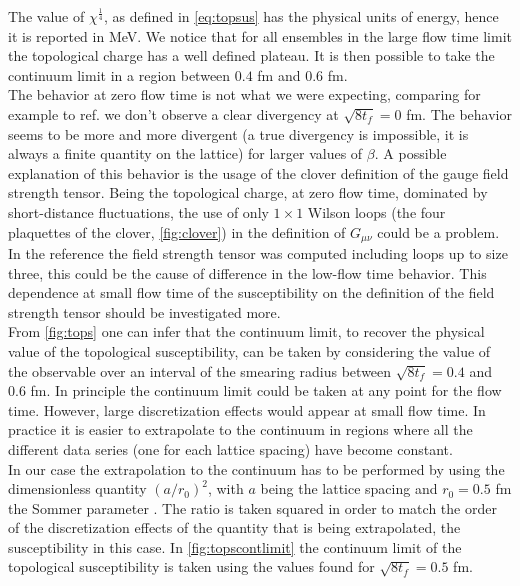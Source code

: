 The value of $\chi^{\frac{1}{4}}$, as defined in \cref{eq:topsus} has the physical units of energy, hence it is reported in MeV. We notice that for all ensembles in the large flow time limit the topological charge has a well defined plateau. It is then possible to take the continuum limit in a region between $0.4$ fm and $0.6$ fm. \\
The behavior at zero flow time is not what we were expecting, comparing for example to ref. \cite{shindler_nucleon_2015} we don't observe a clear divergency at $\sqrt{8t_f} = 0$ fm. The behavior seems to be more and more divergent (a true divergency is impossible, it is always a finite quantity on the lattice) for larger values of $\beta$. A possible explanation of this behavior is the usage of the clover definition of the gauge field strength tensor. Being the topological charge, at zero flow time, dominated by short-distance fluctuations, the use of only $1\times1$ Wilson loops (the four plaquettes of the clover, \cref{fig:clover}) in the definition of $G_{\mu\nu}$ could be a problem. In the reference the field strength tensor was computed including loops up to size three, this could be the cause of difference in the low-flow time behavior. This dependence at small flow time of the susceptibility on the definition of the field strength tensor should be investigated more. \\
From \cref{fig:tops} one can infer that the continuum limit, to recover the physical value of the topological susceptibility, can be taken by considering the value of the observable over an interval of the smearing radius between  $\sqrt{8t_f} = 0.4$ and $0.6$ fm. In principle the continuum limit could be taken at any point for the flow time. However, large discretization effects would appear at small flow time. In practice it is easier to extrapolate to the continuum in regions where all the different data series (one for each lattice spacing) have become constant. \\
In our case the extrapolation to the continuum has to be performed by using the dimensionless quantity $(a/r_0)^2$, with $a$ being the lattice spacing and $r_0 = 0.5$ fm the Sommer parameter \cite{guagnelli_precision_1998}. The ratio is taken squared in order to match the order of the discretization effects of the quantity that is being extrapolated, the susceptibility in this case. In \cref{fig:topscontlimit} the continuum limit of the topological susceptibility is taken using the values found for $\sqrt{8t_f}=0.5$ fm.   


